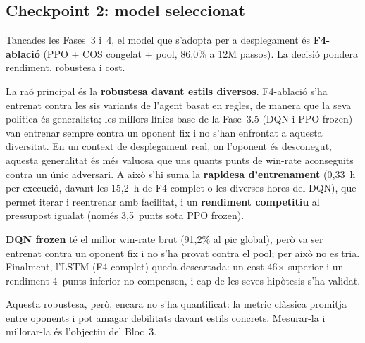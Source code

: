 \subsection{Checkpoint 2: model seleccionat}
\label{sec:checkpoint2}

Tancades les Fases~3 i~4, el model que s'adopta per a desplegament és \textbf{F4-ablació}
(PPO + COS congelat + pool, 86{,}0\% a 12M passos). La decisió pondera rendiment, robustesa
i cost.

La raó principal és la \textbf{robustesa davant estils diversos}. F4-ablació s'ha entrenat
contra les sis variants de l'agent basat en regles, de manera que la seva política és
generalista; les millors línies base de la Fase~3.5 (DQN i PPO frozen) van entrenar sempre
contra un oponent fix i no s'han enfrontat a aquesta diversitat. En un context de
desplegament real, on l'oponent és desconegut, aquesta generalitat és més valuosa que uns
quants punts de win-rate aconseguits contra un únic adversari. A això s'hi suma la
\textbf{rapidesa d'entrenament} (0{,}33~h per execució, davant les 15{,}2~h de F4-complet o
les diverses hores del DQN), que permet iterar i reentrenar amb facilitat, i un
\textbf{rendiment competitiu} al pressupost igualat (només 3{,}5~punts sota PPO frozen).

\textbf{DQN frozen} té el millor win-rate brut (91{,}2\% al pic global), però va ser entrenat
contra un oponent fix i no s'ha provat contra el pool; per això no es tria. Finalment, l'\ac{LSTM} (F4-complet) queda
descartada: un cost 46$\times$ superior i un rendiment 4~punts inferior no compensen, i cap
de les seves hipòtesis s'ha validat.

Aquesta robustesa, però, encara no s'ha quantificat: la \(\text{metric}\) clàssica
promitja entre oponents i pot amagar debilitats davant estils concrets. Mesurar-la i
millorar-la és l'objectiu del Bloc~3.

